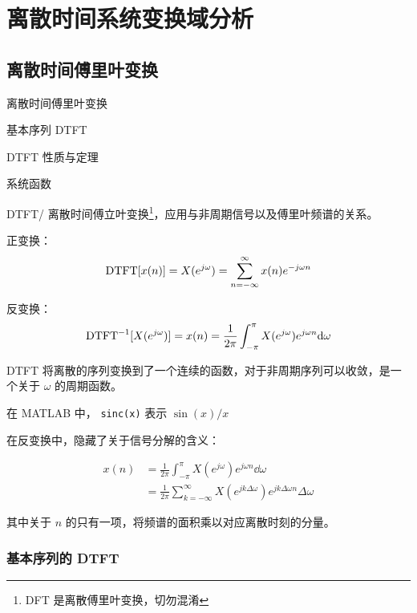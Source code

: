 \documentclass[cn,11pt,chinese,black,simple]{../elegantbook}
\begin{document}
\fi 
\def\chapname{week02}

\chapter{离散时间系统变换域分析}

\section{离散时间傅里叶变换}

\begin{introduction}
    \item 离散时间傅里叶变换
    \item 基本序列 DTFT
    \item DTFT 性质与定理
    \item 系统函数
\end{introduction}

\begin{definition}[离散时间傅里叶变换]
    DTFT/ 离散时间傅立叶变换\footnote{DFT 是离散傅里叶变换，切勿混淆}，应用与非周期信号以及傅里叶频谱的关系。

    正变换：\[\text{DTFT}[x(n)] = X(e^{j \omega}) = \sum_{n=-\infty}^{\infty} x(n) e^{-j \omega n}\]

    反变换：\[\text{DTFT}^{-1}[X(e^{j \omega})] = x(n) = \frac{1}{2 \pi} \int_{-\pi}^{\pi} X(e^{j\omega})e^{j \omega n} \mathrm{d}\omega\]
\end{definition}

DTFT 将离散的序列变换到了一个连续的函数，对于非周期序列可以收敛，是一个关于 \(\omega\) 的周期函数。

在 MATLAB 中， \lstinline{sinc(x)} 表示 \(\sin(x)/x\)

在反变换中，隐藏了关于信号分解的含义：

\[\begin{aligned}
    x(n) &= \frac{1}{2 \pi} \int_{-\pi}^{\pi} X(e^{j \omega}) e^{j \omega n} \dd{\omega}\\
    &= \frac{1}{2 \pi} \sum_{k = -\infty}^{\infty} X(e^{j k \Delta \omega})e^{j k \Delta \omega n}\Delta \omega 
\end{aligned}\]

其中关于 \(n\) 的只有一项，将频谱的面积乘以对应离散时刻的分量。

\subsection{基本序列的 DTFT}
\end{document}
